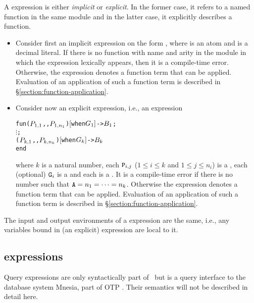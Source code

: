 A  expression is either \emph{implicit} or \emph{explicit}.  In the former
case, it refers to a named
function in the same module and in the latter case, it explicitly describes a function.
\begin{itemize}
\item Consider first an implicit  expression on
the form , where  is an atom and  is a decimal literal.
If there is no function with name  and
arity  in the module in which the  expression lexically appears, then
it is a compile-time error.  Otherwise,
the expression  denotes a function term that can be applied.
Evaluation of an application of such a function term is described in
\S\ref{section:function-application}.
\item
{}
Consider now an explicit  expression, i.e., an expression
\begin{alltt}
fun (\(\Z{P}\sb{1,1}\),\tdots,\(\Z{P}\sb{1,n\sb{1}}\)) \([\)when \(\Z{G}\sb{1}]\) -> \(\Z{B}\sb{1}\) ;
    \(\vdots\) ;
    (\(\Z{P}\sb{k,1}\),\tdots,\(\Z{P}\sb{k,n\sb{k}}\)) \([\)when \(\Z{G}\sb{k}]\) -> \(\Z{B}\sb{k}\)
end
\end{alltt}
where $k$ is a natural number, each ${\tt{\sl P}}_{i,j}$ ($1\leq i\leq k$ and
$1\leq j\leq n_i$) is a , each (optional) ${\tt{\sl G}}_i$ is a 
and each  is a .  It is a compile-time error if
there is no number  such that ${\tt{\sl A}}=n_1=\cdots=n_k$.
Otherwise the  expression denotes a function term that can be applied.
Evaluation of an application of such a function term is described in
\S\ref{section:function-application}.
\end{itemize}

\ENVIRONMENTS

The input and output environments of a  expression are the same, i.e.,
any variables bound in (an explicit)  expression are local to it.

\ifOld
\subsection{ expressions}

\label{section:query-exprs}

Query expressions are only syntactically part of \Erlang\ but is a
query interface to the database system Mnesia, part of OTP
\cite[ch.~6]{otp-mnesia}.  Their semantics will not be described in
detail here.

